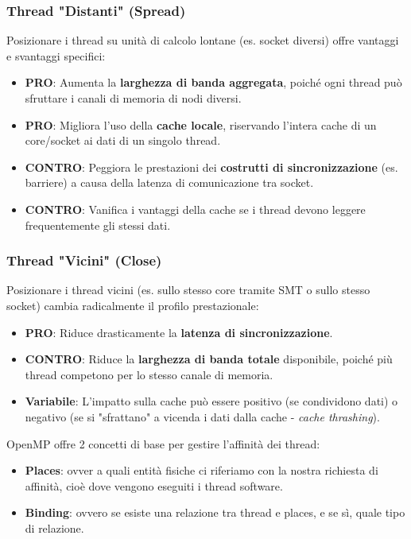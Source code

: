 \subsubsection*{Thread "Distanti" (Spread)}
Posizionare i thread su unità di calcolo lontane (es. socket diversi) offre vantaggi e svantaggi specifici:
\begin{itemize}
    \item \textbf{PRO}: Aumenta la \textbf{larghezza di banda aggregata}, poiché ogni thread può sfruttare i canali di memoria di nodi diversi.
    \item \textbf{PRO}: Migliora l'uso della \textbf{cache locale}, riservando l'intera cache di un core/socket ai dati di un singolo thread.
    \item \textbf{CONTRO}: Peggiora le prestazioni dei \textbf{costrutti di sincronizzazione} (es. barriere) a causa della latenza di comunicazione tra socket.
    \item \textbf{CONTRO}: Vanifica i vantaggi della cache se i thread devono leggere frequentemente gli stessi dati.
\end{itemize}

\subsubsection*{Thread "Vicini" (Close)}
Posizionare i thread vicini (es. sullo stesso core tramite SMT o sullo stesso socket) cambia radicalmente il profilo prestazionale:
\begin{itemize}
    \item \textbf{PRO}: Riduce drasticamente la \textbf{latenza di sincronizzazione}.
    \item \textbf{CONTRO}: Riduce la \textbf{larghezza di banda totale} disponibile, poiché più thread competono per lo stesso canale di memoria.
    \item \textbf{Variabile}: L'impatto sulla cache può essere positivo (se condividono dati) o negativo (se si "sfrattano" a vicenda i dati dalla cache - \textit{cache thrashing}).
\end{itemize}

OpenMP offre 2 concetti di base per gestire l'affinità dei thread:
\begin{itemize}
    \item \textbf{Places}: ovver a quali entità fisiche ci riferiamo con la nostra richiesta di affinità, cioè dove vengono eseguiti i thread software.
    \item \textbf{Binding}: ovvero se esiste una relazione tra thread e places, e se sì, quale tipo di relazione.
\end{itemize}
